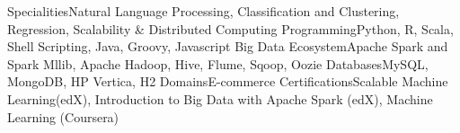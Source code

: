 \begin{cvskills}
\cvskill
{Specialities}{Natural Language Processing, Classification and Clustering, Regression, Scalability \& Distributed Computing}
\cvskill
{Programming}{Python, R, Scala, Shell Scripting, Java, Groovy, Javascript} 
\cvskill
{Big Data Ecosystem}{Apache Spark and Spark Mllib, Apache Hadoop, Hive, Flume, Sqoop, Oozie}
\cvskill
{Databases}{MySQL, MongoDB, HP Vertica, H2}
\cvskill
{Domains}{E-commerce}
\cvskill
{Certifications}{Scalable Machine Learning(edX), Introduction to Big Data with Apache Spark (edX), Machine Learning (Coursera)}
\end{cvskills}
